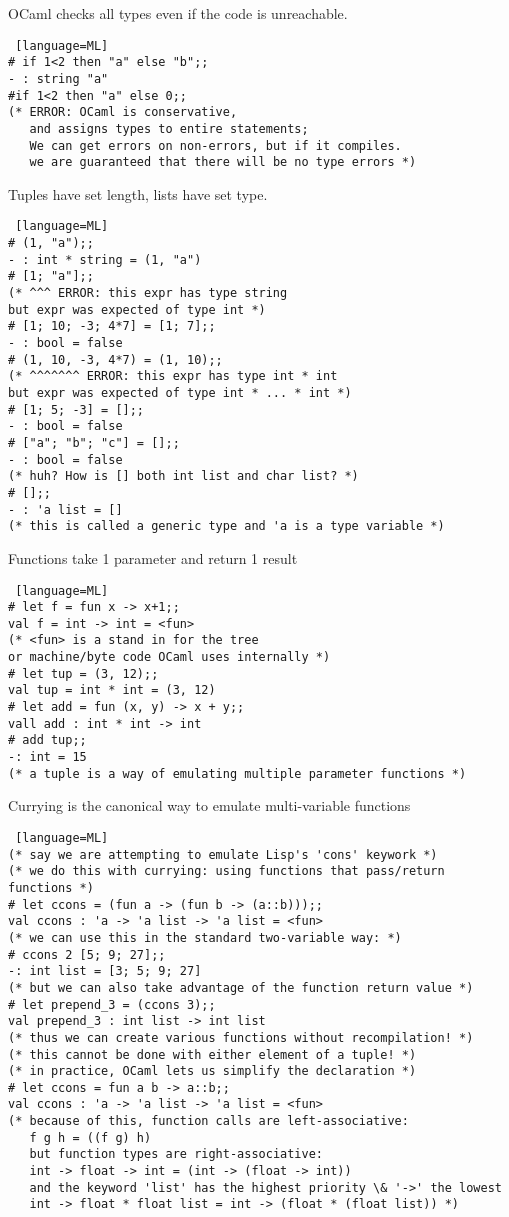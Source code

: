 \documentclass[../../lecture_notes.tex]{subfiles}
\begin{document}
\noindent OCaml checks all types even if the code is unreachable.
\begin{lstlisting} [language=ML]
# if 1<2 then "a" else "b";;
- : string "a"
#if 1<2 then "a" else 0;;
(* ERROR: OCaml is conservative, 
   and assigns types to entire statements;
   We can get errors on non-errors, but if it compiles.
   we are guaranteed that there will be no type errors *)
\end{lstlisting} \medskip

\noindent Tuples have set length, lists have set type.
\begin{lstlisting} [language=ML]
# (1, "a");;
- : int * string = (1, "a")
# [1; "a"];;
(* ^^^ ERROR: this expr has type string 
but expr was expected of type int *)
# [1; 10; -3; 4*7] = [1; 7];;
- : bool = false
# (1, 10, -3, 4*7) = (1, 10);;
(* ^^^^^^^ ERROR: this expr has type int * int
but expr was expected of type int * ... * int *)
# [1; 5; -3] = [];;
- : bool = false
# ["a"; "b"; "c"] = [];;
- : bool = false
(* huh? How is [] both int list and char list? *)
# [];;
- : 'a list = []
(* this is called a generic type and 'a is a type variable *)
\end{lstlisting} \medskip

\noindent Functions take 1 parameter and return 1 result
\begin{lstlisting} [language=ML]
# let f = fun x -> x+1;;
val f = int -> int = <fun>
(* <fun> is a stand in for the tree 
or machine/byte code OCaml uses internally *)
# let tup = (3, 12);;
val tup = int * int = (3, 12)
# let add = fun (x, y) -> x + y;;
vall add : int * int -> int
# add tup;;
-: int = 15
(* a tuple is a way of emulating multiple parameter functions *)
\end{lstlisting} \medskip

\noindent Currying is the canonical way to emulate multi-variable functions
\begin{lstlisting} [language=ML]
(* say we are attempting to emulate Lisp's 'cons' keywork *)
(* we do this with currying: using functions that pass/return functions *)
# let ccons = (fun a -> (fun b -> (a::b)));;
val ccons : 'a -> 'a list -> 'a list = <fun>
(* we can use this in the standard two-variable way: *)
# ccons 2 [5; 9; 27];;
-: int list = [3; 5; 9; 27]
(* but we can also take advantage of the function return value *)
# let prepend_3 = (ccons 3);;
val prepend_3 : int list -> int list
(* thus we can create various functions without recompilation! *)
(* this cannot be done with either element of a tuple! *)
(* in practice, OCaml lets us simplify the declaration *)
# let ccons = fun a b -> a::b;;
val ccons : 'a -> 'a list -> 'a list = <fun>
(* because of this, function calls are left-associative:
   f g h = ((f g) h)
   but function types are right-associative:
   int -> float -> int = (int -> (float -> int))
   and the keyword 'list' has the highest priority \& '->' the lowest
   int -> float * float list = int -> (float * (float list)) *)
\end{lstlisting} \medskip
\end{document}
